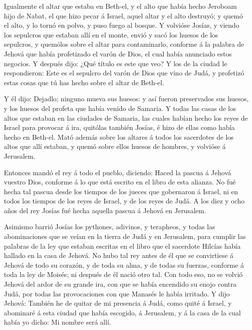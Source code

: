  Igualmente el altar que estaba en Beth-el, y el alto que
había hecho Jeroboam hijo de Nabat, el que hizo pecar á Israel, aquel
altar y el alto destruyó; y quemó el alto, y lo tornó en polvo, y puso
fuego al bosque.  Y volvióse Josías, y viendo los sepulcros
que estaban allí en el monte, envió y sacó los huesos de los sepulcros,
y quemólos sobre el altar para contaminarlo, conforme á la palabra de
Jehová que había profetizado el varón de Dios, el cual había anunciado
estos negocios.  Y después dijo: ¿Qué título es este que
veo? Y los de la ciudad le respondieron: Este es el sepulcro del varón
de Dios que vino de Judá, y profetizó estas cosas que tú has hecho sobre
el altar de Beth-el.

 Y él dijo: Dejadlo; ninguno mueva sus huesos: y así fueron
preservados sus huesos, y los huesos del profeta que había venido de
Samaria.  Y todas las casas de los altos que estaban en las
ciudades de Samaria, las cuales habían hecho los reyes de Israel para
provocar á ira, quitólas también Josías, é hizo de ellas como había
hecho en Beth-el.  Mató además sobre los altares á todos
los sacerdotes de los altos que allí estaban, y quemó sobre ellos huesos
de hombres, y volvióse á Jerusalem.

 Entonces mandó el rey á todo el pueblo, diciendo: Haced la
pascua á Jehová vuestro Dios, conforme á lo que está escrito en el libro
de esta alianza.  No fué hecha tal pascua desde los tiempos
de los jueces que gobernaron á Israel, ni en todos los tiempos de los
reyes de Israel, y de los reyes de Judá.  A los diez y ocho
años del rey Josías fué hecha aquella pascua á Jehová en Jerusalem.

 Asimismo barrió Josías los pythones, adivinos, y
terapheos, y todas las abominaciones que se veían en la tierra de Judá y
en Jerusalem, para cumplir las palabras de la ley que estaban escritas
en el libro que el sacerdote Hilcías había hallado en la casa de Jehová.
 No hubo tal rey antes de él que se convirtiese á Jehová de
todo su corazón, y de toda su alma, y de todas su fuerzas, conforme á
toda la ley de Moisés; ni después de él nació otro tal. 
Con todo eso, no se volvió Jehová del ardor de su grande ira, con que se
había encendido su enojo contra Judá, por todas las provocaciones con
que Manasés le había irritado.  Y dijo Jehová: También he
de quitar de mi presencia á Judá, como quité á Israel, y abominaré á
esta ciudad que había escogido, á Jerusalem, y á la casa de la cual
había yo dicho: Mi nombre será allí.

